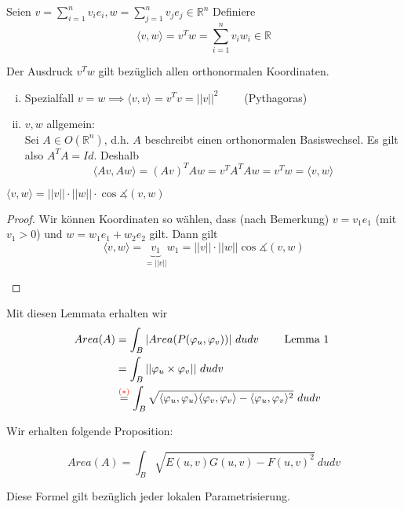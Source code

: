 \documentclass[../main.tex]{subfiles}
\begin{document}
\begin{einschub}
    Seien $v = \sum \limits_{i=1}^n v_ie_i, w = \sum \limits_{j=1}^n v_je_j \in \mathbb{R}^n$ 
    Definiere
    $$\langle v,w\rangle = v^Tw = \sum \limits_{i=1}^n v_iw_i \in \mathbb{R}$$
    \begin{remark}
        Der Ausdruck $v^Tw$ gilt bezüglich allen orthonormalen Koordinaten.
    \end{remark}
    \begin{enumerate}[i)]
        \item Spezialfall $v=w \implies \langle v,v \rangle = v^Tv = ||v||^2 \qquad$ (Pythagoras)
        \item $v,w$ allgemein: \\
        Sei $A \in O(\mathbb{R}^n)$, d.h. $A$ beschreibt einen orthonormalen Basiswechsel. Es gilt also
        $A^TA = Id$. Deshalb
        $$\langle Av, Aw \rangle = (Av)^TAw = v^TA^TAw=v^Tw = \langle v,w\rangle $$
    \end{enumerate}
    \begin{lemma}
        $\langle v,w \rangle = ||v||\cdot ||w|| \cdot \cos \measuredangle (v,w)$
    \end{lemma}
    \begin{proof}
        \begin{minipage}[t]{0.8\columnwidth}
            Wir können Koordinaten so wählen, dass (nach Bemerkung) $v=v_1e_1$ (mit $v_1>0$) und $w=w_1e_1+w_2e_2$ gilt.
            Dann gilt
            $$\langle v,w \rangle = \underbrace{v_1}_{=||v||}w_1 = ||v|| \cdot ||w|| \cos \measuredangle(v,w)$$
            \end{minipage}
        \begin{minipage}[t]{0.15\columnwidth}
            \begin{figure}[H]
                \centering
                \def\svgwidth{\textwidth}
                
            \end{figure}
        \end{minipage}

    \end{proof}
    Mit diesen Lemmata erhalten wir
    \begin{align*}
        Area(A) &= \int _B |Area(P(\varphi _u, \varphi _v))|\ dudv \qquad \text { Lemma 1 }\\
        &= \int _B ||\varphi _u \times \varphi _v || \ dudv \\
        &\overset{\textcolor{red}{(*)}}{=} \int _B \sqrt{\langle \varphi _u, \varphi_u \rangle \langle \varphi _v, \varphi _v\rangle- \langle \varphi _u, \varphi_v\rangle ^2} \ dudv
    \end{align*}
\end{einschub}
Wir erhalten folgende Proposition:
\begin{proposition}
    $$Area(A) = \int _B \sqrt{E(u,v)G(u,v)-F(u,v)^2}\ dudv$$
\end{proposition}
\begin{remark}
    Diese Formel gilt bezüglich jeder lokalen Parametrisierung.
\end{remark}
\end{document}
